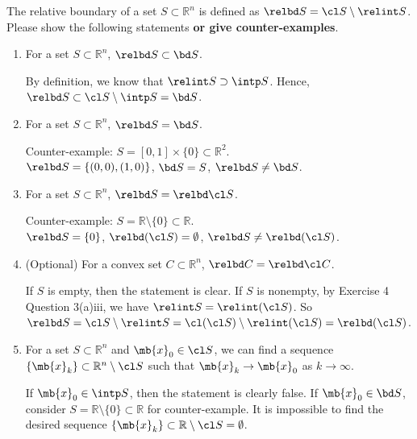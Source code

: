 \begin{exercise}
  The relative boundary of a set $S\subset\mathbb{R}^n$ is defined as
  $\relbd S = \cl S \setminus  \relint S$.
  Please show the following statements {\bf or give counter-examples}.
  \begin{enumerate}
    \item
      For a set $S\subset\mathbb{R}^n$, $\relbd S\subset \bd S$.

      \begin{solution}
        By definition, we know that $\relint S \supset \intp S$. Hence, $\relbd S \subset \cl S \setminus \intp S = \bd S$.
      \end{solution}
    \item
      For a set $S\subset\mathbb{R}^n$, $\relbd S= \bd S$.

      \begin{solution}
        Counter-example: $S = [0,1]\times \{0\}\subset \mathbb{R}^2$. \\ $\relbd S = \{(0,0),(1,0)\}$, $\bd S = S$, $\relbd S\neq \bd S$.
      \end{solution}
    \item
      For a set $S \subset \mathbb{R}^n$, $\relbd S=\relbd \cl S$.

      \begin{solution}
        Counter-example: $S = \mathbb{R} \setminus \{0\} \subset \mathbb{R}$.\\ $\relbd S = \{0\}$, $\relbd (\cl S) = \emptyset$, $\relbd S\neq \relbd (\cl S)$.
      \end{solution}
    \item (Optional)
      For a convex set  $C \subset \mathbb{R}^n$, $\relbd C=\relbd \cl C$.

      \begin{solution}
        If $S$ is empty, then the statement is clear. If $S$ is nonempty, by Exercise 4 Question 3(a)iii, we have $\relint S = \relint (\cl S)$. So $\relbd S = \cl S \setminus \relint S = \cl (\cl S) \setminus \relint (\cl S) = \relbd (\cl S)$.
      \end{solution}
    \item
      For a set $S\subset\mathbb{R}^n$ and $\mb{x}_0\in \cl S$, we can find a sequence $\{\mb{x}_k\}\subset\mathbb{R}^n\setminus\cl S$ such that $\mb{x}_k\to\mb{x}_0$ as $k\to\infty$.

      \begin{solution}
        If $\mb{x}_0 \in \intp S$, then the statement is clearly false. If $\mb{x}_0 \in \bd S$, consider $S = \mathbb{R} \setminus \{0\} \subset \mathbb{R}$ for counter-example. It is impossible to find the desired sequence $\{\mb{x}_k\} \subset \mathbb{R} \setminus \cl S = \emptyset$.
      \end{solution}
  \end{enumerate}
\end{exercise}
\newpage


